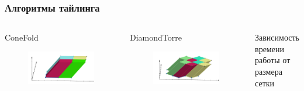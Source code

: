 \documentclass[presentation,18pt]{beamer}
\begin{document}
\begin{frame}[t]
	\label{tiling}
	\frametitle{Алгоритмы тайлинга}

	\begin{columns}

		\begin{block}{ConeFold}
			\begin{figure}
				\includegraphics[width=\textwidth]{img/CropConeFold.png}
			\end{figure}

		\end{block}

		\begin{block}{DiamondTorre}
			\begin{figure}
				\includegraphics[width=\textwidth]{img/CropDiamondTorre.png}
			\end{figure}

		\end{block}

		\begin{alertblock}{Зависимость времени работы от размера сетки}
			\vspace{160pt}
		\end{alertblock}

	\end{columns}
\end{frame}
\end{document}
